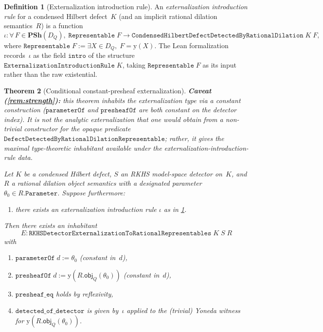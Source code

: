\documentclass[12pt]{article}
\theoremstyle{plain}
\newtheorem{theorem}{Theorem}[section]
\theoremstyle{definition}
\newtheorem{definition}[theorem]{Definition}
\theoremstyle{remark}
\newcommand{\Yon}{\mathrm{y}}
\newcommand{\PSh}{\mathbf{PSh}}
\newcommand{\DQ}{D_{Q}}
\newcommand{\objQ}{\mathsf{obj}_{Q}}
\begin{document}
\begin{definition}[Externalization introduction rule]
\label{def:intro-rule}
An \emph{externalization introduction rule} for a condensed Hilbert
defect~$K$ (and an implicit rational dilation semantics~$R$) is a
function
\[
  \iota\colon
  \forall\,F\in\PSh(\DQ),\;
  \texttt{Representable}\;F
  \to \texttt{CondensedHilbertDefectDetectedByRationalDilation}\;K\;F,
\]
where $\texttt{Representable}\;F := \exists X\in\DQ,\;F = \Yon(X)$.
The Lean formalization records~$\iota$ as the field
$\texttt{intro}$ of the structure
$\texttt{ExternalizationIntroductionRule}\;K$, taking
$\texttt{Representable}\;F$ as its input rather than the raw
existential.
\end{definition}

\begin{theorem}[Conditional constant-presheaf externalization]
\label{thm:cond-ext}
\textbf{Caveat (\cref{rem:strength}):} this theorem inhabits the
externalization \emph{type} via a \emph{constant} construction
($\texttt{parameterOf}$ and $\texttt{presheafOf}$ are both constant
on the detector index).  It is not the analytic externalization
that one would obtain from a non-trivial constructor for the opaque
predicate $\texttt{DefectDetectedByRationalDilationRepresentable}$;
rather, it gives the maximal type-theoretic inhabitant available
under the externalization-introduction-rule data.

Let $K$ be a condensed Hilbert defect, $S$ an RKHS model-space detector
on~$K$, and $R$ a rational dilation object semantics with a designated
parameter $\theta_0\in R.\texttt{Parameter}$.  Suppose furthermore:
\begin{enumerate}[label=(\roman*)]
  \item there exists an externalization introduction rule
    $\iota$ as in \cref{def:intro-rule}.
\end{enumerate}
Then there exists an inhabitant
\[
  E\colon \texttt{RKHSDetectorExternalizationToRationalRepresentables}
  \;K\;S\;R
\]
with
\begin{enumerate}[label=(\arabic*)]
  \item $\texttt{parameterOf}\;d := \theta_0$ (constant in~$d$),
  \item $\texttt{presheafOf}\;d := \Yon(R.\objQ(\theta_0))$ (constant
    in~$d$),
  \item $\texttt{presheaf\_eq}$ holds by reflexivity,
  \item $\texttt{detected\_of\_detector}$ is given by~$\iota$ applied
    to the (trivial) Yoneda witness for $\Yon(R.\objQ(\theta_0))$.
\end{enumerate}
\end{theorem}
\end{document}

